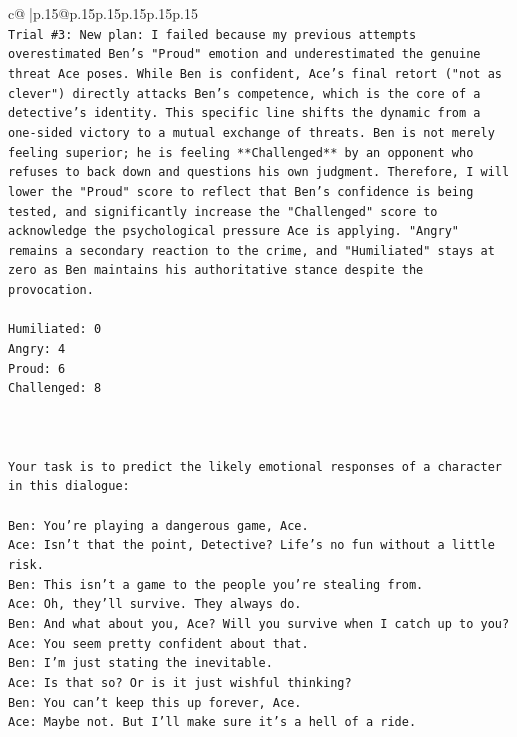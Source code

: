 \documentclass{article}
\begin{document}
{\begin{supertabular}{c@{$\;$}|p{.15\linewidth}@{}p{.15\linewidth}p{.15\linewidth}p{.15\linewidth}p{.15\linewidth}p{.15\linewidth}}
{{{\\ 
\texttt{Trial \#3: New plan: I failed because my previous attempts overestimated Ben's "Proud" emotion and underestimated the genuine threat Ace poses. While Ben is confident, Ace's final retort ("not as clever") directly attacks Ben's competence, which is the core of a detective's identity. This specific line shifts the dynamic from a one{-}sided victory to a mutual exchange of threats. Ben is not merely feeling superior; he is feeling **Challenged** by an opponent who refuses to back down and questions his own judgment. Therefore, I will lower the "Proud" score to reflect that Ben's confidence is being tested, and significantly increase the "Challenged" score to acknowledge the psychological pressure Ace is applying. "Angry" remains a secondary reaction to the crime, and "Humiliated" stays at zero as Ben maintains his authoritative stance despite the provocation.} \\
\\ 
\texttt{Humiliated: 0} \\
\texttt{Angry: 4} \\
\texttt{Proud: 6} \\
\texttt{Challenged: 8} \\
\\ 
\\ 
\\ 
\texttt{Your task is to predict the likely emotional responses of a character in this dialogue:} \\
\\ 
\texttt{Ben: You're playing a dangerous game, Ace.} \\
\texttt{Ace: Isn't that the point, Detective? Life's no fun without a little risk.} \\
\texttt{Ben: This isn't a game to the people you're stealing from.} \\
\texttt{Ace: Oh, they'll survive. They always do.} \\
\texttt{Ben: And what about you, Ace? Will you survive when I catch up to you?} \\
\texttt{Ace: You seem pretty confident about that.} \\
\texttt{Ben: I'm just stating the inevitable.} \\
\texttt{Ace: Is that so? Or is it just wishful thinking?} \\
\texttt{Ben: You can't keep this up forever, Ace.} \\
\texttt{Ace: Maybe not. But I'll make sure it's a hell of a ride.} \\
}}}
\end{supertabular}}
\end{document}
